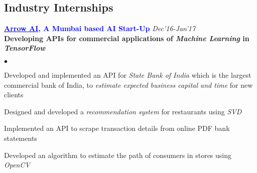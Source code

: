 \documentclass[margin,line, 9pt]{res}
\newenvironment{list2}{
  \begin{list}{$\bullet$}{%
      \setlength{\itemsep}{0.03in}
      \setlength{\parsep}{0in} \setlength{\parskip}{0in}
      \setlength{\topsep}{0in} \setlength{\partopsep}{0in} 
      \setlength{\leftmargin}{0.2in}}}{\end{list}}
\begin{document}
\begin{resume}
\section{\sc Industry Internships}
{\bf \href{http://arrowai.com}{\textcolor{blue} {Arrow AI}}, {\textcolor{blue}{A Mumbai based AI Start-Up}}}  \hfill {\it Dec'16-Jan'17} \\
\textbf{Developing APIs for commercial applications of \emph{Machine Learning} in \emph{TensorFlow}}\\
\vspace*{-.13in}
\begin{list2}
\item Developed and implemented an API for \emph{State Bank of India} which is the largest commercial bank of India, to \emph{estimate expected business capital and time} for new clients
\item Designed and developed a \emph{recommendation system} for restaurants using \emph{SVD}
\item Implemented an API to scrape transaction details from online PDF bank statements
\item Developed an algorithm to estimate the path of consumers in stores using \emph{OpenCV} 
\end{list2}
% 
% 
% 

\end{resume}
\end{document}
